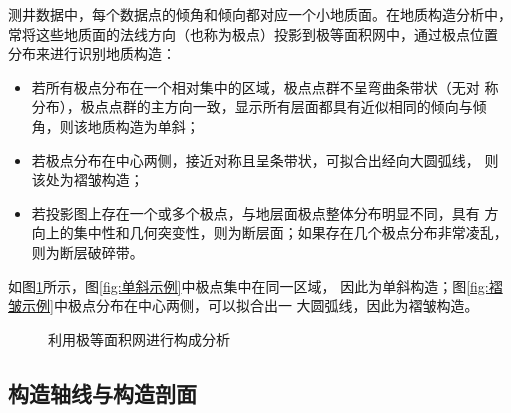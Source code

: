 \documentclass[a4paper,twoside]{ctexart}
\begin{document}
测井数据中，每个数据点的倾角和倾向都对应一个小地质面。在地质构造分析中，
常将这些地质面的法线方向（也称为极点）投影到极等面积网中，通过极点位置
分布来进行识别地质构造： 
\begin{itemize}
\item 若所有极点分布在一个相对集中的区域，极点点群不呈弯曲条带状（无对
  称分布），极点点群的主方向一致，显示所有层面都具有近似相同的倾向与倾
  角，则该地质构造为单斜；
\item 若极点分布在中心两侧，接近对称且呈条带状，可拟合出经向大圆弧线，
  则该处为褶皱构造；
\item 若投影图上存在一个或多个极点，与地层面极点整体分布明显不同，具有
  方向上的集中性和几何突变性，则为断层面；如果存在几个极点分布非常凌乱，
  则为断层破碎带。
\end{itemize}

如图\ref{fig:构成分析}所示，图\ref{fig:单斜示例}中极点集中在同一区域，
因此为单斜构造；图\ref{fig:褶皱示例}中极点分布在中心两侧，可以拟合出一
大圆弧线，因此为褶皱构造。

\begin{figure}[htbp]
  \centering
  \hspace{1cm}
  
  \caption{利用极等面积网进行构成分析}
  \label{fig:构成分析}
\end{figure}

\subsection{构造轴线与构造剖面}
\end{document}
